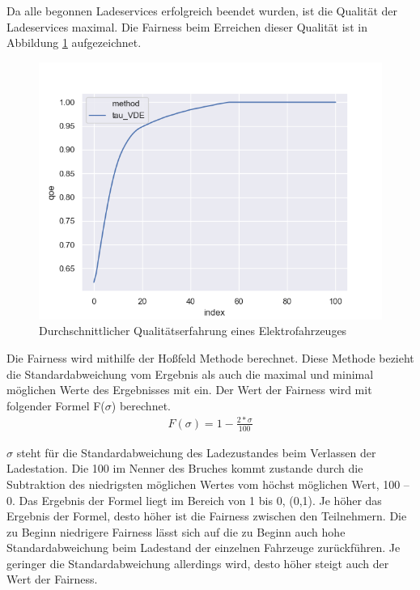 Da alle begonnen Ladeservices erfolgreich beendet wurden, ist die Qualität der Ladeservices maximal. Die Fairness beim Erreichen dieser Qualität ist in Abbildung \ref{Abb_VDEtauFairness} aufgezeichnet. \\
\begin{figure}[htb]
\centering
	\includegraphics[scale=0.4]{img/VDE_tau/tau_VDE_2_qoe.png}
	\caption{Durchschnittlicher Qualitätserfahrung eines Elektrofahrzeuges}
	\label{Abb_VDEtauFairness}
\end{figure}

Die Fairness wird mithilfe der Hoßfeld Methode \cite{Hosfeld2018} berechnet. Diese Methode bezieht die Standardabweichung vom Ergebnis als auch die maximal und minimal möglichen Werte des Ergebnisses mit ein. Der Wert der Fairness wird mit folgender Formel F($\sigma$) berechnet.
\begin{align}
	F(\sigma) = 1-\frac{2*\sigma}{100}
\end{align}

$\sigma$ steht für die Standardabweichung des Ladezustandes beim Verlassen der Ladestation. Die 100 im Nenner des Bruches kommt zustande durch die Subtraktion des niedrigsten möglichen Wertes vom höchst möglichen Wert, 100 – 0. Das Ergebnis der Formel liegt im Bereich von 1 bis 0, (0,1). Je höher das Ergebnis der Formel, desto höher ist die Fairness zwischen den Teilnehmern. Die zu Beginn niedrigere Fairness lässt sich auf die zu Beginn auch hohe Standardabweichung beim Ladestand der einzelnen Fahrzeuge zurückführen. Je geringer die Standardabweichung allerdings wird, desto höher steigt auch der Wert der Fairness.

